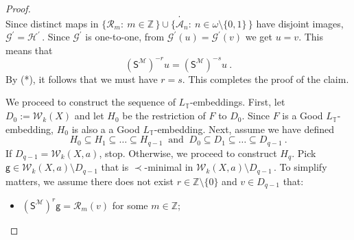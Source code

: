 \documentclass[10pt,a4paper, openany,  oldfontcommands]{memoir}
\newtheorem{open problem} [theorem] {Open Problem}
\newtheorem{open question} [theorem] {Open Question}
\renewcommand{\mathrm}{\mathsf}
\begin{document}
\begin{proof}
\[ \     .
\] 
Since  distinct maps in 
$  \lbrace  \mathcal{R}_m  :   \   m  \in  \mathbb{Z}  \,   \rbrace    \cup  
  \lbrace  \mathcal{A}_n   :   \   n  \in  \omega  \setminus  \lbrace 0,   1   \rbrace   \,   \rbrace       $ 
  have disjoint images,    $   \mathcal{G}^{  \prime  }    =   \mathcal{H}^{  \prime  }    \,   $.
  Since  $   \mathcal{G}^{  \prime  }   $  is one-to-one,
  from  $   \mathcal{G}^{  \prime  }  \left( u  \right)    =     \mathcal{G}^{  \prime  }  \left( v  \right)     $  we get    $  u =  v  $.
This means that  
\[
 \left(   \mathrm{S}^{  \mathcal{M}  }  \right)^{-r}  u     =      \left(   \mathrm{S}^{  \mathcal{M}  }  \right)^{-s}   u  
\       .
\]
By (*),  it follows that  we must have  $  r  =  s  $. 
This completes the proof of the claim. 









We proceed to construct the sequence of    $ L_{  \mathbb{T} }  $-embeddings. 
First,  let   $  D_0  :=   \mathcal{W}_{ k }  \left(  X  \right)    $
and let    $  H_0  $  be the restriction of  $F$ to $  D_0  $. 
Since  $F$ is a   \textsf{Good}  $ L_{  \mathbb{T} }  $-embedding, 
$  H_0 $  is also a   a   \textsf{Good}  $ L_{  \mathbb{T} }  $-embedding. 
Next,  assume we have defined  
\[
  H_0  \subseteq  H_1  \subseteq   \ldots  \subseteq  H_{ q-1}  
  \    \mbox{  and  }     \  
  D_0  \subseteq  D_1  \subseteq   \ldots    \subseteq  D_{ q-1 } 
  \       .
  \]
If  $   D_{ q-1}  =   \mathcal{W}_{  k }  \left(  X  , a  \right)         $, stop.
Otherwise, we proceed to  construct  $ H_q  $. 
Pick $    \mathsf{g}   \in  \mathcal{W}_{  k }  \left(  X  , a   \right)    \setminus D_{ q-1 }  $ 
that is  $  \prec $-minimal in   $     \mathcal{W}_{  k }  \left(  X  , a   \right)    \setminus D_{ q-1 }     \,   $. 
To simplify matters,  we assume  there does not exist  $  r    \in    \mathbb{Z}   \setminus  \lbrace  0  \rbrace $ and 
$  v  \in  D_{ q-1}  $ that:  
\begin{itemize}
\item[-]   $   \left(  \mathrm{S}^{  \mathcal{M}  }  \right)^r   \mathsf{g}   =   \mathcal{R}_m  \left(  v  \right)  $ for some  $  m \in  \mathbb{Z} $; 



\end{itemize}
\end{proof}
\end{document}
